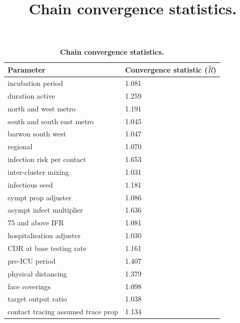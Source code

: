 \begin{table}[ht]
\renewcommand{\baselinestretch}{1}
	\begin{tabular}[ht]{| p{7cm} | p{6cm} |}
	\hline
		\textbf{Parameter} & \textbf{Convergence statistic} (\(\hat{R}\)) \\
		
\hline incubation period & 1.081 \\

\hline duration active & 1.259 \\

\hline north and west metro & 1.191 \\

\hline south and south east metro & 1.045 \\

\hline barwon south west & 1.047 \\

\hline regional & 1.070 \\

\hline infection risk per contact & 1.653 \\

\hline inter-cluster mixing & 1.031 \\

\hline infectious seed & 1.181 \\

\hline sympt prop adjuster & 1.086 \\

\hline asympt infect multiplier & 1.636 \\

\hline 75 and above IFR & 1.081 \\

\hline hospitalisation adjuster & 1.030 \\

\hline CDR at base testing rate & 1.161 \\

\hline pre-ICU period & 1.407 \\

\hline physical distancing & 1.379 \\

\hline face coverings & 1.098 \\

\hline target output ratio & 1.038 \\

\hline contact tracing assumed trace prop & 1.134 \\

	\hline
    \end{tabular}
    \title{Chain convergence statistics.}
    \caption{\textbf{Chain convergence statistics.}}	
    \label{tab:convergence}
\end{table}


